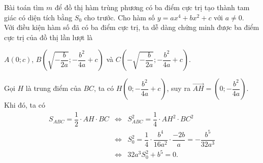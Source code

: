 \begin{dang}{Bài toán tìm $m$ để  đồ thị hàm trùng phương có ba điểm cực trị tạo thành tam giác có diện tích bằng $S_0$ cho trước.}
	Cho hàm số $y=ax^4+bx^2+c$ với $a\neq 0$.\\
	Với điều kiện hàm số đã có ba điểm cực trị, ta dễ dàng chứng minh được ba điểm cực trị của đồ thị lần lượt là 
	\begin{center}
		$A(0;c)$, $B\left(\sqrt{-\dfrac{b}{2a}};-\dfrac{b^2}{4a}+c\right)$ và $C\left(-\sqrt{-\dfrac{b}{2a}};-\dfrac{b^2}{4a}+c\right)$.
	\end{center}
	Gọi $H$ là trung điểm của $BC$, ta có $H\left(0;-\dfrac{b^2}{4a}+c\right)$, suy ra $\overrightarrow{AH}=\left(0;-\dfrac{b^2}{4a}\right)$.\\
	Khi đó, ta có 
	\begin{eqnarray*}
		S_{ABC}=\dfrac{1}{2}\cdot AH\cdot BC&\Leftrightarrow& S^2_{ABC}=\dfrac{1}{4}\cdot AH^2\cdot BC^2\\
		&\Leftrightarrow&S_0^2=\dfrac{1}{4}\cdot\dfrac{b^4}{16a^2}\cdot\dfrac{-2b}{a}=-\dfrac{b^5}{32a^3}\\
		&\Leftrightarrow&\boxed{32a^3S_0^2+b^5=0.}
	\end{eqnarray*}
\end{dang}

